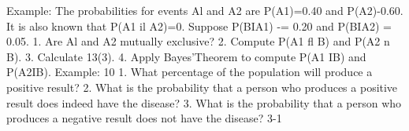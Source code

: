 


Example: The probabilities for events Al and A2 are P(A1)=0.40 and P(A2)-0.60. It is also known that P(A1 il A2)=0. Suppose P(BIA1) -= 0.20 and P(BIA2) = 0.05. 
1. Are Al and A2 mutually exclusive? 2. Compute P(A1 fl B) and P(A2 n B). 3. Calculate 13(3). 4. Apply Bayes'Theorem to compute P(A1 IB) and P(A2IB). 
Example: 10%
1. What percentage of the population will produce a positive result? 
2. What is the probability that a person who produces a positive result does indeed have the 
disease? 
3. What is the probability that a person who produces a negative result does not have the disease? 
3-1 


